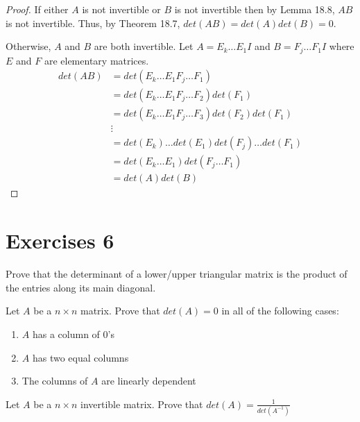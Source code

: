 \begin{proof}
    If either $A$ is not invertible or $B$ is not invertible then by Lemma 18.8, $AB$ is not invertible. Thus, by Theorem 18.7, $det(AB)=det(A)det(B)=0$.

    Otherwise, $A$ and $B$ are both invertible. Let $A=E_k\ldots E_1I$ and $B=F_j\ldots F_1I$ where $E$ and $F$ are elementary matrices.
    \begin{align*}
        det(AB)&=det(E_k\ldots E_1 F_j\ldots F_1)\\
        &=det(E_k\ldots E_1F_j\ldots F_2)det(F_1)\tag{by Lemma 18.6}\\
        &=det(E_k\ldots E_1F_j\ldots F_3)det(F_2)det(F_1)\tag{by Lemma 18.6}\\
        &\vdots\\
        &=det(E_k)\ldots det(E_1)det(F_j)\ldots det(F_1)\\
        &=det(E_k\ldots E_1)det(F_j\ldots F_1)\\
        &=det(A)det(B)
    \end{align*}
\end{proof}
\section{Exercises 6}
\begin{exercise}
    Prove that the determinant of a lower/upper triangular matrix is the product of the entries along its main diagonal.
\end{exercise}
\begin{exercise}
    Let $A$ be a $n\times n$ matrix. Prove that $det(A)=0$ in all of the following cases:
    \begin{enumerate}
        \item $A$ has a column of $0$'s
        \item $A$ has two equal columns
        \item The columns of $A$ are linearly dependent
    \end{enumerate}
\end{exercise}
\begin{exercise}
    Let $A$ be a $n\times n$ invertible matrix. Prove that $det(A)=\frac{1}{det(A^{-1})}$
\end{exercise}